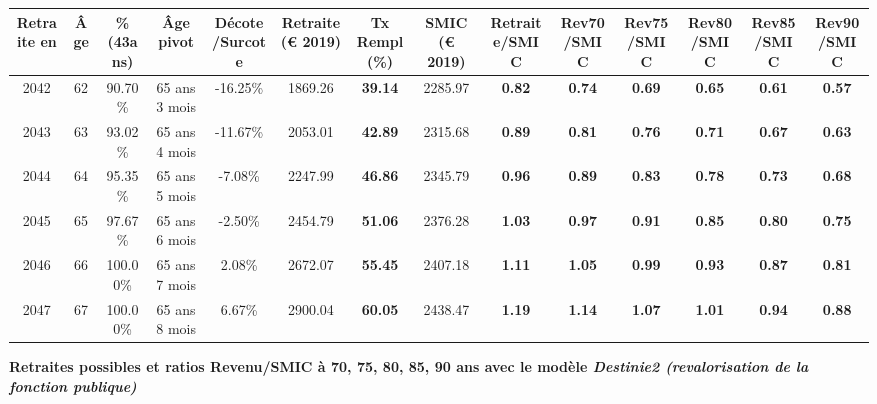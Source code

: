 \begin{adjustbox}{max width=\textwidth} 
\begin{tabular}[htb]{|c|c||c|c|c||c|c||c||c|c|c|c|c|c|} 
\hline 
 Retraite en &  Âge &  \%(43ans) &  Âge pivot &  Décote/Surcote &  Retraite (\euro{} 2019) &  Tx Rempl(\%) &  SMIC (\euro{} 2019) &  Retraite/SMIC &  Rev70/SMIC &  Rev75/SMIC &  Rev80/SMIC &  Rev85/SMIC &  Rev90/SMIC \\ 
\hline \hline 
 2042 &  62 &  90.70\% &  65 ans 3 mois &  -16.25\% &  1869.26 &  {\bf 39.14} &  2285.97 &  {\bf {\color{red} 0.82}} &  {\bf {\color{red} 0.74}} &  {\bf {\color{red} 0.69}} &  {\bf {\color{red} 0.65}} &  {\bf {\color{red} 0.61}} &  {\bf {\color{red} 0.57}} \\ 
\hline 
 2043 &  63 &  93.02\% &  65 ans 4 mois &  -11.67\% &  2053.01 &  {\bf 42.89} &  2315.68 &  {\bf {\color{red} 0.89}} &  {\bf {\color{red} 0.81}} &  {\bf {\color{red} 0.76}} &  {\bf {\color{red} 0.71}} &  {\bf {\color{red} 0.67}} &  {\bf {\color{red} 0.63}} \\ 
\hline 
 2044 &  64 &  95.35\% &  65 ans 5 mois &  -7.08\% &  2247.99 &  {\bf 46.86} &  2345.79 &  {\bf {\color{red} 0.96}} &  {\bf {\color{red} 0.89}} &  {\bf {\color{red} 0.83}} &  {\bf {\color{red} 0.78}} &  {\bf {\color{red} 0.73}} &  {\bf {\color{red} 0.68}} \\ 
\hline 
 2045 &  65 &  97.67\% &  65 ans 6 mois &  -2.50\% &  2454.79 &  {\bf 51.06} &  2376.28 &  {\bf 1.03} &  {\bf {\color{red} 0.97}} &  {\bf {\color{red} 0.91}} &  {\bf {\color{red} 0.85}} &  {\bf {\color{red} 0.80}} &  {\bf {\color{red} 0.75}} \\ 
\hline 
 2046 &  66 &  100.00\% &  65 ans 7 mois &  2.08\% &  2672.07 &  {\bf 55.45} &  2407.18 &  {\bf 1.11} &  {\bf 1.05} &  {\bf {\color{red} 0.99}} &  {\bf {\color{red} 0.93}} &  {\bf {\color{red} 0.87}} &  {\bf {\color{red} 0.81}} \\ 
\hline 
 2047 &  67 &  100.00\% &  65 ans 8 mois &  6.67\% &  2900.04 &  {\bf 60.05} &  2438.47 &  {\bf 1.19} &  {\bf 1.14} &  {\bf 1.07} &  {\bf 1.01} &  {\bf {\color{red} 0.94}} &  {\bf {\color{red} 0.88}} \\ 
\hline 
\hline 
\end{tabular} 
\end{adjustbox} 
 
 \vspace{0.1cm} 
{\bf \noindent Retraites possibles et ratios Revenu/SMIC à 70, 75, 80, 85, 90 ans avec le modèle \emph{Destinie2 (revalorisation de la fonction publique)}}  
 
